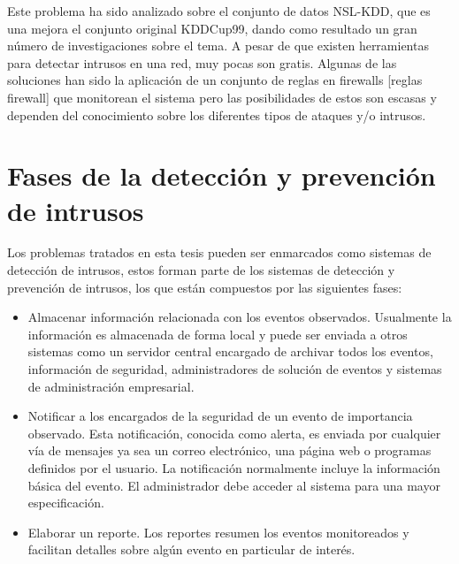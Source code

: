 



Este problema ha sido analizado sobre el conjunto de datos NSL-KDD, que es una mejora el conjunto original KDDCup99, dando como resultado un gran número de investigaciones sobre el tema. A pesar de que existen herramientas para detectar intrusos en una red, muy pocas son gratis. Algunas de las soluciones han sido la aplicación de un conjunto de reglas en firewalls [reglas firewall] que monitorean el sistema pero las posibilidades de estos son escasas y dependen del conocimiento sobre los diferentes tipos de ataques y/o intrusos.

\section{Fases de la detección y prevención de intrusos}
Los problemas tratados en esta tesis pueden ser enmarcados como sistemas de detección de intrusos, estos forman parte de los sistemas de detección y prevención de intrusos, los que están compuestos por las siguientes fases:

\begin{itemize}
    \item Almacenar información relacionada con los eventos observados. Usualmente la información es almacenada de forma local y puede ser enviada a otros sistemas como un servidor central encargado de archivar todos los eventos, información de seguridad, administradores de solución de eventos y sistemas de administración empresarial.
    \item Notificar a los encargados de la seguridad de un evento de importancia observado. Esta notificación, conocida como alerta, es enviada por cualquier vía de mensajes ya sea un correo electrónico, una página web o programas definidos por el usuario. La notificación normalmente incluye la información básica del evento. El administrador debe acceder al sistema para una mayor especificación.
    \item Elaborar un reporte. Los reportes resumen los eventos monitoreados y facilitan detalles sobre algún evento en particular de interés.
\end{itemize}

